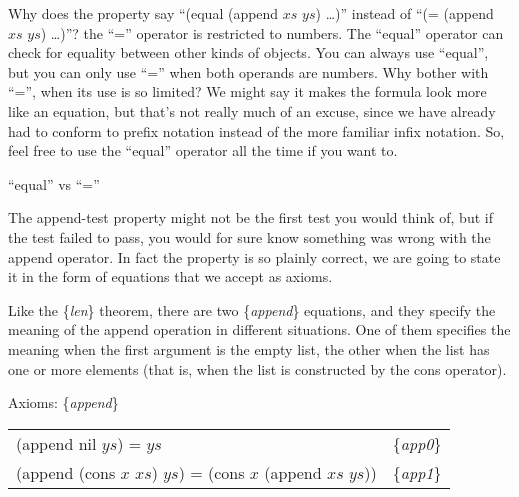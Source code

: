 \begin{aside}
Why does the property say ``(equal (append $xs$ $ys$) \dots)'' instead of ``(= (append $xs$ $ys$) \dots)''? the ``='' operator is restricted to numbers. The ``equal'' operator can check for equality between other kinds of objects. You can always use ``equal'', but you can only use ``='' when both operands are numbers. Why bother with ``='', when its use is so limited? We might say it makes the formula look more like an equation, but that's not really much of an excuse, since we have already had to conform to prefix notation instead of the more familiar infix notation. So, feel free to use the ``equal'' operator all the time if you want to.
\caption{``equal'' vs ``=''}
\label{equal}
\end{aside}

\begin{comment}
This might not be the first test you would think of, but if the test failed to pass, you would for sure know something was wrong with the append operator.
This is another property that ACL2 can prove when it is stated as a theorem.

\begin{Verbatim}
(defthmd append-thm
  (equal (append xs ys)
         (if (consp xs)
             (cons (first xs)            ; {app1}
                   (append (rest xs) ys))
             ys)))                       ; {app0}
\end{Verbatim}
\end{comment}

The append-test property might not be the first test you would think of,
but if the test failed to pass,
you would for sure know something was wrong with the append operator.
In fact the property is so plainly correct,
we are going to state it in the form of equations that we accept as axioms.

Like the \{\emph{len}\} theorem, there are two \{\emph{append}\} equations,
and they specify the meaning of the append operation in different situations.
One of them specifies the meaning when the first argument is the empty list,
the other when the list has one or more elements
(that is, when the list is constructed by the cons operator).
\begin{samepage}
\label{append-equations}
\begin{center}
Axioms: \{\emph{append}\} \\
\begin{tabular}{ll}
(append nil $ys$) =  $ys$                                     & \{\emph{app0}\} \\
(append (cons $x$ $xs$) $ys$) = (cons $x$ (append $xs$ $ys$)) & \{\emph{app1}\} \\
\end{tabular}
\end{center}
\end{samepage}

